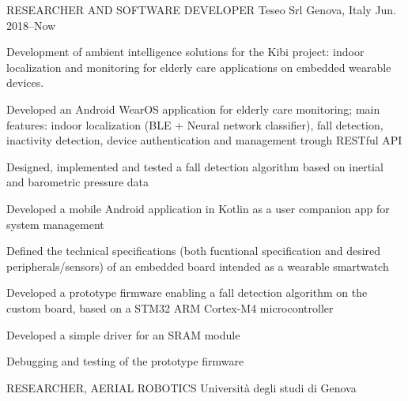 

\begin{cventries}

  \cventry
    {RESEARCHER AND SOFTWARE DEVELOPER} %
    {Teseo Srl} %
    {Genova, Italy} %
    {Jun. 2018--Now} %
    {
      \begin{cvparagraph}
      Development of ambient intelligence solutions for the Kibi project: indoor localization and monitoring for elderly care applications on embedded wearable devices.
      \end{cvparagraph}
      \begin{cvitems} %
        \item {Developed an Android WearOS application for elderly care monitoring; main features: indoor localization (BLE + Neural network classifier), fall detection, inactivity detection, device authentication and management trough RESTful API}
        \item {Designed, implemented and tested a fall detection algorithm based on inertial and barometric pressure data}
        \item {Developed a mobile Android application in Kotlin as a user companion app for system management}
        \item {Defined the technical specifications (both fucntional specification and desired peripherals/sensors) of an embedded board intended as a wearable smartwatch}
        \item {
          Developed a prototype firmware enabling a fall detection algorithm on the custom board, based on a STM32 ARM Cortex-M4 microcontroller
        }
        \item{Developed a simple driver for an SRAM module}
        \item{Debugging and testing of the prototype firmware} 
      \end{cvitems}
    }
  \cventry
    {RESEARCHER, AERIAL ROBOTICS} %
    {Università degli studi di Genova} %

\end{cventries}
